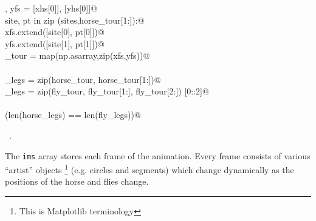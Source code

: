 \documentclass[11.5pt]{report}
\begin{document}
\begin{flushleft}
\begin{list}{}{}
\mbox{}\verb@xfs , yfs = [xhs[0]], [yhs[0]]@\\
\mbox{}\verb@for site, pt in zip (sites,horse_tour[1:]):@\\
\mbox{}\verb@         xfs.extend([site[0], pt[0]])@\\
\mbox{}\verb@         yfs.extend([site[1], pt[1]])@\\
\mbox{}\verb@fly_tour = map(np.asarray,zip(xfs,yfs))@\\
\mbox{}\verb@@\\
\mbox{}\verb@horse_legs = zip(horse_tour, horse_tour[1:])@\\
\mbox{}\verb@fly_legs   = zip(fly_tour, fly_tour[1:], fly_tour[2:]) [0::2]@\\
\mbox{}\verb@@\\
\mbox{}\verb@assert(len(horse_legs) == len(fly_legs))@\\
\mbox{}\verb@@{\NWsep}
\end{list}
\vspace{-1.5ex}
\footnotesize
\begin{list}{}{\setlength{\itemsep}{-\parsep}\setlength{\itemindent}{-\leftmargin}}
\item \NWtxtMacroRefIn\ .

\item{}
\end{list}
\vspace{4ex}
\end{flushleft}


\vspace{-0.8cm} \newchunk The \verb|ims| array stores each frame of the animation. Every frame consists of 
various ``artist'' objects \footnote{This is Matplotlib terminology} (e.g. circles and segments) which change dynamically as the positions of the horse 
and flies change. 
\end{document}
